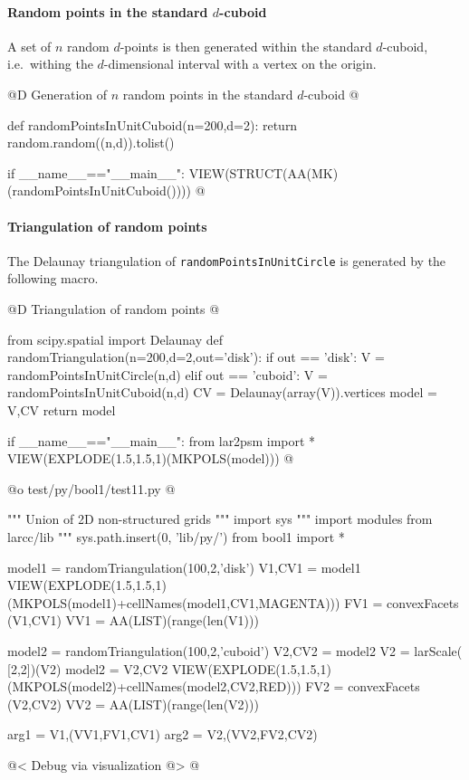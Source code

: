 \documentclass[11pt,oneside]{article}	%
\begin{document}
\paragraph{Random points in the standard $d$-cuboid} 
A set of $n$ random $d$-points is then generated within the standard $d$-cuboid, i.e.~withing the $d$-dimensional interval with a vertex on the origin.

@D Generation of $n$ random points in the standard $d$-cuboid 
@{def randomPointsInUnitCuboid(n=200,d=2):
	return random.random((n,d)).tolist()

if __name__=="__main__":
	VIEW(STRUCT(AA(MK)(randomPointsInUnitCuboid()))) 
@}



\paragraph{Triangulation of random points} The Delaunay triangulation of \texttt{randomPointsInUnitCircle} is generated by the following macro.


@D Triangulation of random points
@{from scipy.spatial import Delaunay
def randomTriangulation(n=200,d=2,out='disk'):
	if out == 'disk':
		V = randomPointsInUnitCircle(n,d)
	elif out == 'cuboid':
		V = randomPointsInUnitCuboid(n,d)
	CV = Delaunay(array(V)).vertices
	model = V,CV
	return model

if __name__=="__main__":
	from lar2psm import *
	VIEW(EXPLODE(1.5,1.5,1)(MKPOLS(model)))
@}



@o test/py/bool1/test11.py
@{""" Union of 2D non-structured grids """
import sys
""" import modules from larcc/lib """
sys.path.insert(0, 'lib/py/')
from bool1 import *

model1 = randomTriangulation(100,2,'disk')
V1,CV1 = model1
VIEW(EXPLODE(1.5,1.5,1)(MKPOLS(model1)+cellNames(model1,CV1,MAGENTA)))
FV1 = convexFacets (V1,CV1)
VV1 = AA(LIST)(range(len(V1)))

model2 = randomTriangulation(100,2,'cuboid')
V2,CV2 = model2
V2 = larScale( [2,2])(V2)
model2 = V2,CV2 
VIEW(EXPLODE(1.5,1.5,1)(MKPOLS(model2)+cellNames(model2,CV2,RED)))
FV2 = convexFacets (V2,CV2)
VV2 = AA(LIST)(range(len(V2)))

arg1 = V1,(VV1,FV1,CV1)
arg2 = V2,(VV2,FV2,CV2)

@< Debug via visualization @>
@}
\end{document}
